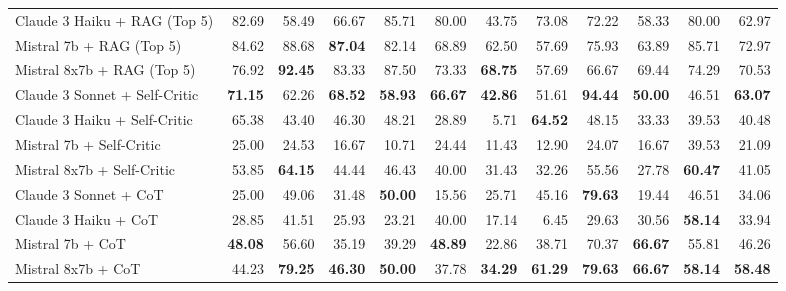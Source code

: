 \begin{table}[H]
{\begin{tabular}{lrrrrrrrrrrr}
Claude 3 Haiku + RAG (Top 5) & 82.69 & 58.49 & 66.67 & 85.71 & 80.00 & 43.75 & 73.08 & 72.22 & 58.33 & 80.00 & 62.97 \\
Mistral 7b + RAG (Top 5) & 84.62 & 88.68 & \textbf{87.04} & 82.14 & 68.89 & 62.50 & 57.69 & 75.93 & 63.89 & 85.71 & 72.97 \\
Mistral 8x7b + RAG (Top 5) & 76.92 & \textbf{92.45} & 83.33 & 87.50 & 73.33 & \textbf{68.75} & 57.69 & 66.67 & 69.44 & 74.29 & 70.53 \\
\rowcolor{Gray}
Claude 3 Sonnet + Self-Critic & \textbf{71.15} & 62.26 & \textbf{68.52} & \textbf{58.93} & \textbf{66.67} & \textbf{42.86} & 51.61 & \textbf{94.44} & \textbf{50.00} & 46.51 & \textbf{63.07} \\
\rowcolor{Gray}
Claude 3 Haiku + Self-Critic & 65.38 & 43.40 & 46.30 & 48.21 & 28.89 & 5.71 & \textbf{64.52} & 48.15 & 33.33 & 39.53 & 40.48 \\
\rowcolor{Gray}
Mistral 7b + Self-Critic & 25.00 & 24.53 & 16.67 & 10.71 & 24.44 & 11.43 & 12.90 & 24.07 & 16.67 & 39.53 & 21.09 \\
\rowcolor{Gray}
Mistral 8x7b + Self-Critic & 53.85 & \textbf{64.15} & 44.44 & 46.43 & 40.00 & 31.43 & 32.26 & 55.56 & 27.78 & \textbf{60.47} & 41.05 \\
Claude 3 Sonnet + CoT & 25.00 & 49.06 & 31.48 & \textbf{50.00} & 15.56 & 25.71 & 45.16 & \textbf{79.63} & 19.44 & 46.51 & 34.06 \\
Claude 3 Haiku + CoT & 28.85 & 41.51 & 25.93 & 23.21 & 40.00 & 17.14 & 6.45 & 29.63 & 30.56 & \textbf{58.14} & 33.94 \\
Mistral 7b + CoT & \textbf{48.08} & 56.60 & 35.19 & 39.29 & \textbf{48.89} & 22.86 & 38.71 & 70.37 & \textbf{66.67} & 55.81 & 46.26 \\
Mistral 8x7b + CoT & 44.23 & \textbf{79.25} & \textbf{46.30} & \textbf{50.00} & 37.78 & \textbf{34.29} & \textbf{61.29} & \textbf{79.63} & \textbf{66.67} & \textbf{58.14} & \textbf{58.48} \\
\bottomrule
\end{tabular}
}
 \label{tab:explicit_20topics_70}
\end{table}


